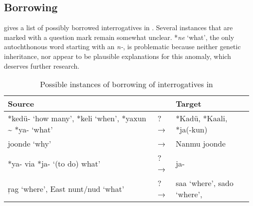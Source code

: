 \clearpage 
\subsection{Borrowing}

 gives a list of possibly borrowed interrogatives in . Several instances that are marked with a question mark remain somewhat unclear.  *\textit{ne} ‘what’, the only autochthonous word starting with an \textit{n-}, is problematic because neither genetic inheritance, nor  appear to be plausible explanations for this anomaly, which deserves further research.

\begin{table}
\caption{Possible instances of borrowing of interrogatives in }
\label{tab:6:14}

\begin{tabularx}{\textwidth}{QlQ}
\lsptoprule

\textbf{Source} &  & \textbf{Target}\\
\midrule
{} *kedü- ‘how many’, *keli ‘when’, *yaxun {\textasciitilde} *ya- ‘what’ & ?→ &  *Kadü, *Kaali, *ja(-kun)\\
 joonde ‘why’ & → & Nanmu  joonde\\
 *ya- via  *ja- ‘(to do) what’ & ?→ &  ja-\\
  \c{r}ag ‘where’, East   nunt/nud ‘what’ & ?→ &  saa ‘where’, sado ‘where’,


\end{tabularx}
\end{table}
